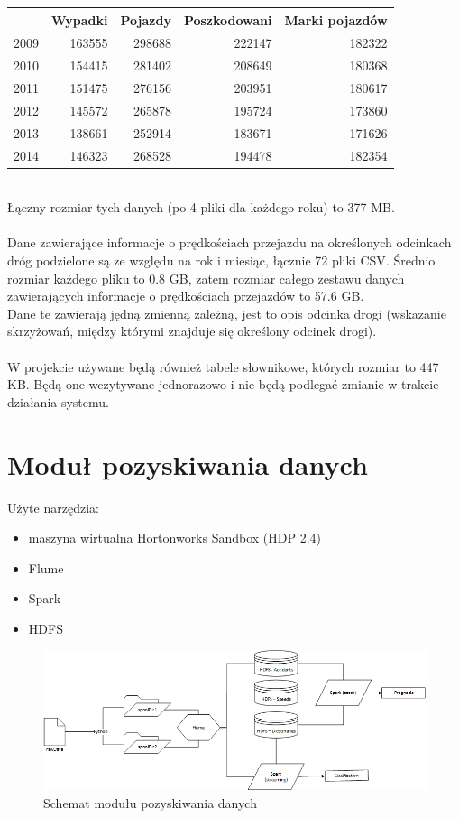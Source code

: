 \documentclass{article}
\begin{document}
\begin{tabular}{|r|r|r|r|r|}
  \hline 
    & Wypadki & Pojazdy & Poszkodowani & Marki pojazdów\\
  \hline 
  2009 & 163555 & 298688 & 222147 & 182322\\
  \hline
  2010 & 154415 & 281402 & 208649 & 180368\\
  \hline
  2011 & 151475 & 276156 & 203951 & 180617\\
  \hline
  2012 & 145572 & 265878 & 195724 & 173860\\
  \hline
  2013 & 138661 & 252914 & 183671 & 171626\\
  \hline
  2014 & 146323 & 268528 & 194478 & 182354\\
  \hline
\end{tabular} \\[0.3cm]
Łączny rozmiar tych danych (po 4 pliki dla każdego roku) to 377 MB.\\\\
Dane zawierające informacje o prędkościach przejazdu na określonych odcinkach dróg podzielone są ze względu na rok i miesiąc, łącznie 72 pliki CSV. Średnio rozmiar każdego pliku to 0.8 GB, zatem rozmiar całego zestawu danych zawierających informacje o prędkościach przejazdów to 57.6 GB.\\
Dane te zawierają jędną zmienną zależną, jest to opis odcinka drogi (wskazanie skrzyżowań, między którymi znajduje się określony odcinek drogi).\\\\
W projekcie używane będą również tabele słownikowe, których rozmiar to 447 KB. Będą one wczytywane jednorazowo i nie będą podlegać zmianie w trakcie działania systemu.


\section{Moduł pozyskiwania danych}

Użyte narzędzia:
\begin{itemize}
    \item maszyna wirtualna Hortonworks Sandbox (HDP 2.4)
    \item Flume
    \item Spark
    \item HDFS
\end{itemize}

\begin{figure}[H]
\centering
\includegraphics[scale=0.6]{schemat}
\caption{Schemat modułu pozyskiwania danych}
\end{figure}
\end{document}
